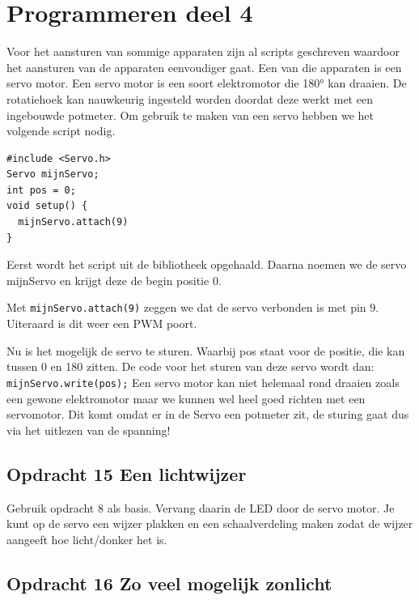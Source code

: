 \documentclass{arduino}
\begin{document}
\newpage

\section{Programmeren deel 4}


Voor het aansturen van sommige apparaten zijn al scripts geschreven waardoor het aansturen van de apparaten eenvoudiger gaat. Een van die apparaten is een servo motor. Een servo motor is een soort elektromotor die \ang{180} kan draaien. De rotatiehoek kan nauwkeurig ingesteld worden doordat deze werkt met een ingebouwde potmeter. Om gebruik te maken van een servo hebben we het volgende script nodig.

\begin{lstlisting}
#include <Servo.h>
Servo mijnServo;
int pos = 0;
void setup() {
  mijnServo.attach(9)
}
\end{lstlisting}

Eerst wordt het script uit de bibliotheek opgehaald. Daarna noemen we de servo mijnServo en krijgt deze de begin positie 0.

Met \lstinline{mijnServo.attach(9)} zeggen we dat de servo verbonden is met pin 9. Uiteraard is dit weer een PWM poort.

Nu is het mogelijk de servo te sturen. Waarbij pos staat voor de positie, die kan tussen 0 en 180 zitten. De code voor het sturen van deze servo wordt dan: \lstinline{mijnServo.write(pos);} Een servo motor kan niet helemaal rond draaien zoals een gewone elektromotor maar we kunnen wel heel goed richten met een servomotor. Dit komt omdat er in de Servo een potmeter zit, de sturing gaat dus via het uitlezen van de spanning!

\subsection{Opdracht 15 Een lichtwijzer}

Gebruik opdracht 8 als basis. Vervang daarin de LED door de servo motor. Je kunt op de servo een wijzer plakken en een schaalverdeling maken zodat de wijzer aangeeft hoe licht/donker het is.

\subsection{Opdracht 16 Zo veel mogelijk zonlicht}

\end{document}
